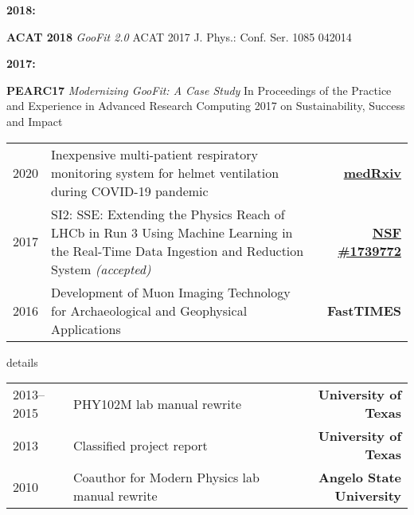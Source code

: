 \documentclass[10pt,letterpaper,english]{moderncv}
\begin{document}
\begin{minipage}[t]{.065\textwidth}
\textbf{2018:}\\
\end{minipage}%
\begin{minipage}[t]{.935\textwidth}
\textbf{ACAT 2018} \emph{GooFit 2.0} ACAT 2017 J. Phys.: Conf. Ser. 1085 042014
\end{minipage}

\begin{minipage}[t]{.065\textwidth}
\textbf{2017:}\\
\end{minipage}%
\begin{minipage}[t]{.935\textwidth}
\textbf{PEARC17} \emph{Modernizing GooFit: A Case Study} In Proceedings of the Practice and Experience in Advanced Research Computing 2017 on Sustainability, Success and Impact
\end{minipage}


\begin{tabularx}{\textwidth}{p{.8in}X>{\bfseries}r}
2020 & Inexpensive multi-patient respiratory monitoring system for helmet ventilation during COVID-19 pandemic & \href{https://doi.org/10.1101/2020.06.29.20141283}{medRxiv} \\
2017 & SI2: SSE: Extending the Physics Reach of LHCb in Run 3 Using Machine Learning in the Real-Time Data Ingestion and Reduction System  \textit{(accepted)} & \href{https://nsf.gov/awardsearch/showAward?AWD_ID=1739772}{NSF \#1739772} \\ %
2016 & Development of Muon Imaging Technology
for Archaeological and Geophysical Applications & FastTIMES \\
%
\end{tabularx}

\begin{taggedblock}{details}
\begin{tabularx}{\textwidth}{p{.8in}X>{\bfseries}r}
2013--2015 & PHY102M lab manual rewrite & University of Texas \\
2013 & Classified project report & University of Texas\\
2010 & Coauthor for Modern Physics lab manual rewrite & Angelo State University\\
\end{tabularx}
\end{taggedblock}

\end{document}
